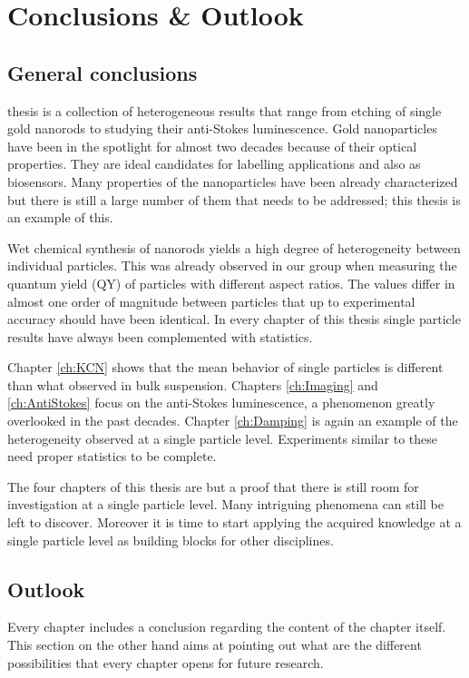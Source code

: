 \chapter{Conclusions \& Outlook}
\label{conclusions}

\section{General conclusions}
 thesis is a collection of heterogeneous results that range from
etching of single gold nanorods to studying their anti-Stokes luminescence. Gold
nanoparticles have been in the spotlight for almost two decades because of their
optical properties\cite{Zijlstra2011}. They are ideal candidates for
labelling\cite{Leduc2013} applications and also as
biosensors\cite{Zijlstra2012}. Many properties of the nanoparticles have been
already characterized but there is still a large number of them that needs to be
addressed; this thesis is an example of this.

Wet chemical synthesis of nanorods yields a high degree of heterogeneity between
individual particles\cite{Lee2013}. This was already observed in our group when
measuring the quantum yield (QY) of particles with different aspect
ratios\cite{Yorulmaz2012}. The values differ in almost one order of magnitude
between particles that up to experimental accuracy should have been identical.
In every chapter of this thesis single particle results have always been
complemented with statistics.

Chapter \ref{ch:KCN} shows that the mean behavior of single particles is
different than what observed in bulk suspension. Chapters \ref{ch:Imaging} and
\ref{ch:AntiStokes} focus on the anti-Stokes luminescence, a phenomenon greatly
overlooked in the past decades. Chapter \ref{ch:Damping} is again an example of
the heterogeneity observed at a single particle level. Experiments similar to
these need proper statistics to be complete. 

The four chapters of this thesis are but a proof that there is still room for
investigation at a single particle level. Many intriguing phenomena can still be
left to discover. Moreover it is time to start applying the acquired knowledge
at a single particle level as building blocks for other disciplines. 

\section{Outlook}
Every chapter includes a conclusion regarding the content of the chapter itself.
This section on the other hand aims at pointing out what are the different
possibilities that every chapter opens for future research.

